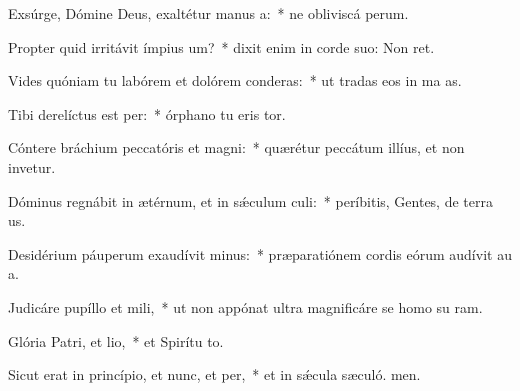 \item Exsúrge, Dómine Deus, exaltétur manus a:~* ne obliviscá perum.
\item Propter quid irritávit ímpius um?~* dixit enim in corde suo: Non ret.
\item Vides quóniam tu labórem et dolórem conderas:~* ut tradas eos in ma as.
\item Tibi derelíctus est per:~* órphano tu eris tor.
\item Cóntere bráchium peccatóris et magni:~* quærétur peccátum illíus, et non invetur.
\item Dóminus regnábit in ætérnum, et in sǽculum culi:~* períbitis, Gentes, de terra us.
\item Desidérium páuperum exaudívit minus:~* præparatiónem cordis eórum audívit au a.
\item Judicáre pupíllo et mili,~* ut non appónat ultra magnificáre se homo su ram.
\item Glória Patri, et lio,~* et Spirítu to.
\item Sicut erat in princípio, et nunc, et per,~* et in sǽcula sæculó. men.
